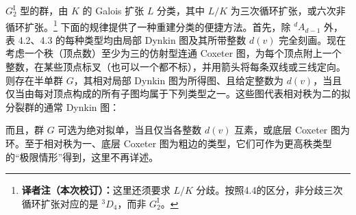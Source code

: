 $G_2^{\mathrm I}$ 型的群，由 $K$ 的 Galois 扩张 $L$ 分类，其中 $L/K$ 为三次循环扩张，或六次非循环扩张。\footnote{\textbf{译者注（本次校订）：}这里还须要求 $L/K$ 分歧。按照4.4的区分，非分歧三次循环扩张对应的是 ${}^3D_4$，而非 $G_2^{\mathrm I}$。}
下面的规律提供了一种重建分类的便捷方法。首先，除 ${}^dA_{d-1}$ 外，表 4.2、4.3 的每种类型均由局部 Dynkin 图及其所带整数 $d(v)$ 完全刻画。现在考虑一个秩（顶点数）至少为三的仿射型连通 Coxeter 图，为每个顶点附上一个整数，在某些顶点标叉（也可以一个都不标），并用箭头将每条双线或三线定向。则存在半单群 $G$，其相对局部 Dynkin 图为所得图、且给定整数为 $d(v)$，当且仅当由每对顶点构成的所有子图均属于下列类型之一。这些图代表相对秩为二的拟分裂群的通常 Dynkin 图：
\begin{center}\end{center}
而且，群 $G$ 可选为绝对拟单，当且仅当各整数 $d(v)$ 互素，或底层 Coxeter 图为环。至于相对秩为一、底层 Coxeter 图为粗边的类型，它们可作为更高秩类型的“极限情形”得到，这里不再详述。

